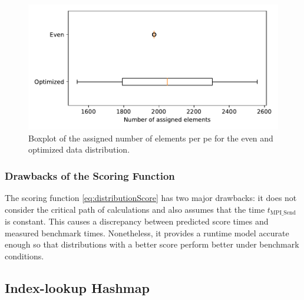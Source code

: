 \begin{figure}
\centering
\includegraphics[scale=0.75]{figures/optimizedDistributionBoxplot.pdf}
\caption{Boxplot of the assigned number of elements per \gls{pe} for the even and optimized data distribution.}
\label{fig:distributionBoxplot}
\end{figure}


\subsubsection{Drawbacks of the Scoring Function}
\label{sec:ScoringFunctionDrawbacks}
The scoring function \eqref{eq:distributionScore} has two major drawbacks:
it does not consider the critical path of calculations and also assumes that the time $t_\textrm{MPI\_Send}$ is constant.
This causes a discrepancy between predicted score times and measured benchmark times.
Nonetheless, it provides a runtime model accurate enough so that distributions with a better score perform better under benchmark conditions.


\subsection{Index-lookup Hashmap}
\label{sec:IndexLookupHashmap}

